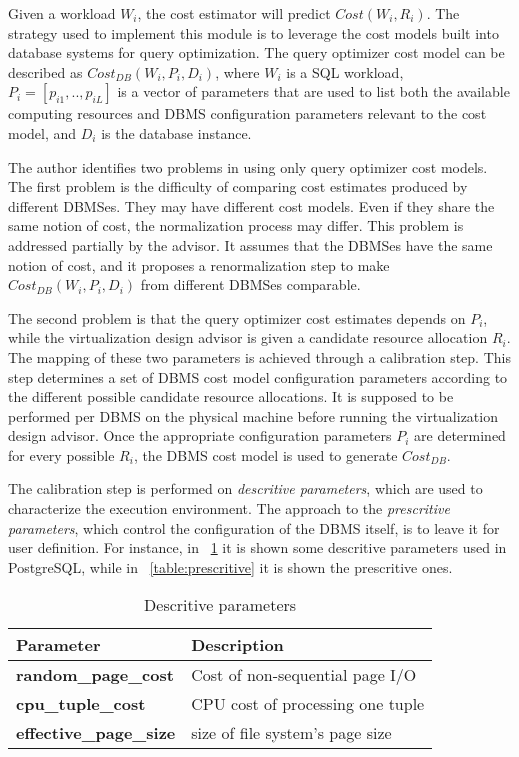 Given a workload $W_{i}$, the cost estimator will predict $Cost(W_{i},R_{i})$. The strategy used to implement this module is to leverage the cost models built into database systems for query optimization. The query optimizer cost model can be described as $Cost_{DB}(W_{i},P_{i},D_{i})$, where $W_{i}$ is a SQL workload, $P_{i} = [p_{i1},..,p_{iL}]$ is a vector of parameters that are used to list both the available computing resources and DBMS configuration parameters relevant to the cost model, and $D_{i}$ is  the database instance. 

The author identifies two problems in using only query optimizer cost models. The first problem is the difficulty of comparing cost estimates produced by different DBMSes. They may have different cost models. Even if they share the same notion of cost, the normalization process may differ. This problem is addressed partially by the advisor. It assumes that the DBMSes have the same notion of cost, and it proposes a renormalization step to make $Cost_{DB}(W_{i},P_{i},D_{i})$ from different DBMSes comparable.%

The second problem is that the query optimizer cost estimates depends on $P_{i}$, while the virtualization design advisor is given a candidate resource allocation $R_{i}$. The mapping of these two parameters is achieved through a calibration step. This step determines a set of DBMS cost model configuration parameters according to the different possible candidate resource allocations. It is supposed to be performed per DBMS on the physical machine before running the virtualization design advisor. Once the appropriate configuration parameters $P_{i}$ are determined for every possible $R_{i}$, the DBMS cost model is used to generate $Cost_{DB}$.

The calibration step is performed on  \textit{descritive parameters}, which are used to characterize the execution environment. The approach to the \textit{prescritive parameters}, which control the configuration of the DBMS itself, is to leave it for user definition. For instance, in ~\ref{table:descritive} it is shown some descritive parameters used in PostgreSQL, while in ~\ref{table:prescritive} it is shown the prescritive ones. 


\begin{table}[ht]
    \centering
    \begin{tabular}{ | l | p{5cm} |}
    \hline
    Parameter & Description  \\ \hline
    \textbf{random\_page\_cost} & Cost of non-sequential page I/O \\ \hline
    \textbf{cpu\_tuple\_cost} & CPU cost of processing one tuple \\ \hline
    \textbf{effective\_page\_size} & size of file system's page size  \\
    \hline
    \end{tabular}
    \caption{Descritive parameters}
    \label{table:descritive}
\end{table}


